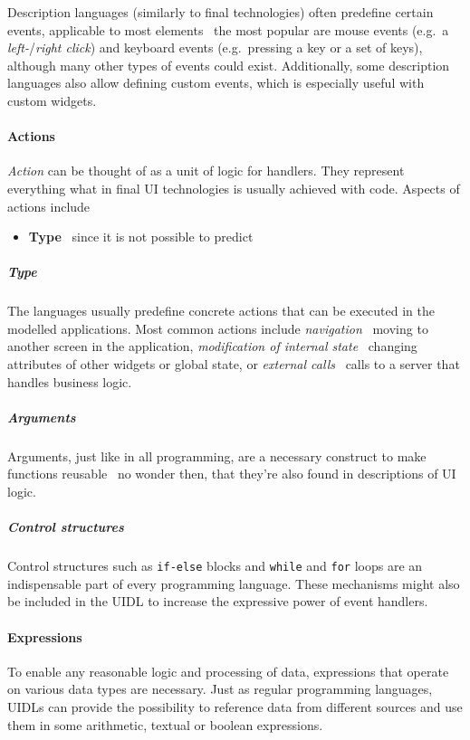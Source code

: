 Description languages (similarly to final technologies) often predefine certain events, applicable to most elements \textendash\ the most popular are mouse events (e.g.\ a \emph{left-}/\emph{right click}) and keyboard events (e.g.\ pressing a key or a set of keys), although many other types of events could exist.
Additionally, some description languages also allow defining custom events, which is especially useful with custom widgets.

\paragraph{Actions}
\emph{Action} can be thought of as a unit of logic for handlers.
They represent everything what in final UI technologies is usually achieved with code.
Aspects of actions include

\begin{itemize}
    \item \textbf{Type} \textendash\ since it is not possible to predict
\end{itemize}

\subparagraph{Type}
The languages usually predefine concrete actions that can be executed in the modelled applications.
Most common actions include \emph{navigation} \textendash\ moving to another screen in the application, \emph{modification of internal state} \textendash\ changing attributes of other widgets or global state, or \emph{external calls} \textendash\ calls to a server that handles business logic.

\subparagraph{Arguments}
Arguments, just like in all programming, are a necessary construct to make functions reusable \textendash\ no wonder then, that they're also found in descriptions of UI logic.

\subparagraph{Control structures}
Control structures such as \texttt{if-else} blocks and \texttt{while} and \texttt{for} loops are an indispensable part of every programming language.
These mechanisms might also be included in the UIDL to increase the expressive power of event handlers.

\paragraph{Expressions}
To enable any reasonable logic and processing of data, expressions that operate on various data types are necessary.
Just as regular programming languages, UIDLs can provide the possibility to reference data from different sources and use them in some arithmetic, textual or boolean expressions.

